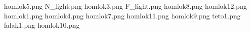 homlok5.png
N_light.png
homlok3.png
F_light.png
homlok8.png
homlok12.png
homlok1.png
homlok4.png
homlok7.png
homlok11.png
homlok9.png
teto1.png
falak1.png
homlok10.png
